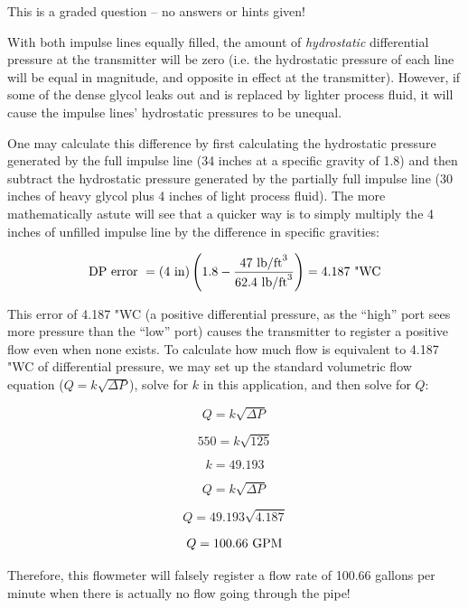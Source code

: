 \eject






This is a graded question -- no answers or hints given!







With both impulse lines equally filled, the amount of {\it hydrostatic} differential pressure at the transmitter will be zero (i.e. the hydrostatic pressure of each line will be equal in magnitude, and opposite in effect at the transmitter).  However, if some of the dense glycol leaks out and is replaced by lighter process fluid, it will cause the impulse lines' hydrostatic pressures to be unequal.

\vskip 10pt

One may calculate this difference by first calculating the hydrostatic pressure generated by the full impulse line (34 inches at a specific gravity of 1.8) and then subtract the hydrostatic pressure generated by the partially full impulse line (30 inches of heavy glycol plus 4 inches of light process fluid).  The more mathematically astute will see that a quicker way is to simply multiply the 4 inches of unfilled impulse line by the difference in specific gravities:

$$\hbox{DP error } = (4 \hbox{ in}) \left(1.8 - {47 \hbox{ lb/ft}^3 \over 62.4 \hbox{ lb/ft}^3} \right) = 4.187 \hbox{ "WC}$$

This error of 4.187 "WC (a positive differential pressure, as the ``high'' port sees more pressure than the ``low'' port) causes the transmitter to register a positive flow even when none exists.  To calculate how much flow is equivalent to 4.187 "WC of differential pressure, we may set up the standard volumetric flow equation ($Q = k \sqrt{\Delta P}$), solve for $k$ in this application, and then solve for $Q$:

$$Q = k \sqrt{\Delta P}$$

$$550 = k \sqrt{125}$$

$$k = 49.193$$

\vskip 10pt

$$Q = k \sqrt{\Delta P}$$

$$Q = 49.193 \sqrt{4.187}$$

$$Q = 100.66 \hbox{ GPM}$$

\vskip 10pt

Therefore, this flowmeter will falsely register a flow rate of 100.66 gallons per minute when there is actually no flow going through the pipe!



